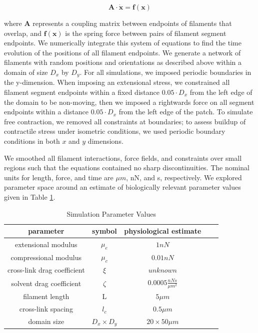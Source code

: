 \documentclass[10pt,letterpaper]{article}
\begin{document}
\begin{equation}
\mathbf{A \cdot \dot x} = \mathbf{f(x)}
\end{equation}

where $\mathbf{A }$ represents a coupling matrix between endpoints of filaments that overlap, and $\mathbf{f(x)}$ is the spring force between pairs of filament segment endpoints.   We numerically integrate this system of equations to find the time evolution of the positions of all filament endpoints. We generate a network of filaments with random positions and orientations as described above within a domain of size $D_x$ by $D_y$.  For all simulations, we imposed periodic boundaries in the y-dimension. When imposing an extensional stress, we constrained all filament segment endpoints within a fixed distance $0.05\cdot D_x$ from the left edge of the domain to be non-moving, then we imposed a rightwards force on all segment endpoints within a distance $0.05\cdot D_x$ from the left edge of the patch.   To simulate free contraction, we removed all constraints at boundaries; to assess buildup of contractile stress under isometric conditions, we used periodic boundary conditions in both $x$ and $y$ dimensions.




We smoothed all filament interactions, force fields, and constraints over small regions such that the equations contained no sharp discontinuities. The nominal units for length, force, and time are $\mu m$, nN, and s, respectively.  We explored parameter space around an estimate of biologically relevant parameter values given in Table \ref{table:para}. 

\begin{table}[h]
\centering
\caption{Simulation Parameter Values}
\label{table:para}
\begin{tabular}{|c|c|c|c|c|}
\hline
{\bf parameter}             & {\bf symbol} & {\bf physiological estimate}          \\ \hline
extensional modulus         & $\mu_e$        & $1 nN $                                               \\
compressional modulus             & $\mu_c$     & $ 0.01 nN $                           \\
cross-link drag coefficient & $\xi$      & $unknown $              \\
solvent drag coefficient     & $\zeta$        & $0.0005 \frac{nN s}{\mu m^2} $      \\
filament length             & L            & $5 \mu m$                                          \\
cross-link spacing          & $l_c$        & $0.5 \mu m$                                         \\
domain size                 & $D_x\times D_y$            & $20\times 50 \mu m$                                 \\ \hline
\end{tabular}
\end{table}
\end{document}
